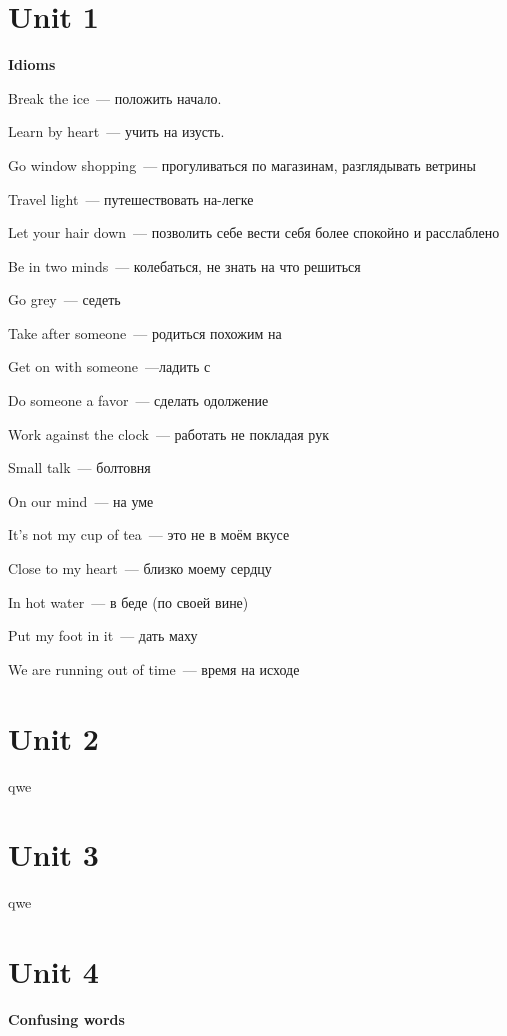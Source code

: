 \documentclass[10pt,a4paper]{article}
\begin{document}
\section{Unit 1}
\textbf{Idioms}

\noindent
Break the ice~--- положить начало.

\noindent
Learn by heart~--- учить на изусть.

\noindent
Go window shopping~--- прогуливаться по магазинам, разглядывать ветрины

\noindent
Travel light~--- путешествовать на-легке

\noindent
Let your hair down~--- позволить себе вести себя более спокойно и расслаблено

\noindent
Be in two minds~--- колебаться, не знать на что решиться

\noindent
Go grey~--- седеть

\noindent
Take after someone~--- родиться похожим на

\noindent
Get on with someone~---ладить с 

\noindent
Do someone a favor~--- сделать одолжение

\noindent
Work against the clock~--- работать не покладая рук

\noindent
Small talk~--- болтовня

\noindent
On our mind~--- на уме

\noindent
It's not my cup of tea~--- это не в моём вкусе

\noindent
Close to my heart~--- близко моему сердцу

\noindent
In hot water~--- в беде (по своей вине)

\noindent
Put my foot in it~--- дать маху

\noindent
We are running out of time~--- время на исходе



\section{Unit 2}
qwe



\section{Unit 3}
qwe



\section{Unit 4}
\textbf{Confusing words}
\end{document}
